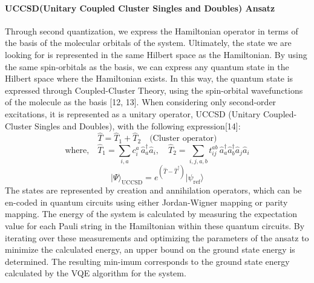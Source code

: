 \documentclass[pdflatex,sn-mathphys-num]{sn-jnl}%
\theoremstyle{thmstyleone}%
\theoremstyle{thmstyletwo}%
\theoremstyle{thmstylethree}%
\begin{document}
\paragraph{UCCSD(Unitary Coupled Cluster Singles and Doubles) Ansatz} \leavevmode \newline
Through second quantization, we express the Hamiltonian operator in terms of the basis of the molecular orbitals of the system. Ultimately, the state we are looking for is represented in the same Hilbert space as the Hamiltonian. By using the same spin-orbitals as the basis, we can express any quantum state in the Hilbert space where the Hamiltonian exists. In this way, the quantum state is expressed through Coupled-Cluster Theory, using the spin-orbital wavefunctions of the molecule as the basis [12, 13]. When considering only second-order excitations, it is represented as a unitary operator, UCCSD (Unitary Coupled-Cluster Singles and Doubles), with the following expression[14]:
\begin{equation*}
\hat{T} = \hat{T}_1 + \hat{T}_2 \quad \text{(Cluster operator)}
\end{equation*}
\begin{equation*}
\text{where,} \quad 
\hat{T}_1 = \sum_{i,a} c_i^a \, \hat{a}_a^{\dagger} \hat{a}_i, \quad
\hat{T}_2 = \sum_{i,j,a,b} t_{ij}^{ab} \, \hat{a}_a^{\dagger} \hat{a}_b^{\dagger} \hat{a}_j \hat{a}_i
\end{equation*}
\begin{equation}
\vert \Psi \rangle_{\mathrm{UCCSD}} = e^{\left( \hat{T} - \hat{T}^{\dagger} \right)} \vert \psi_{\mathrm{ref}} \rangle
\end{equation}
The states are represented by creation and annihilation operators, which can be en-coded in quantum circuits using either Jordan-Wigner mapping or parity mapping. The energy of the system is calculated by measuring the expectation value for each Pauli string in the Hamiltonian within these quantum circuits. By iterating over these measurements and optimizing the parameters of the ansatz to minimize the calculated energy, an upper bound on the ground state energy is determined. The resulting min-imum corresponds to the ground state energy calculated by the VQE algorithm for the system.
\end{document}
